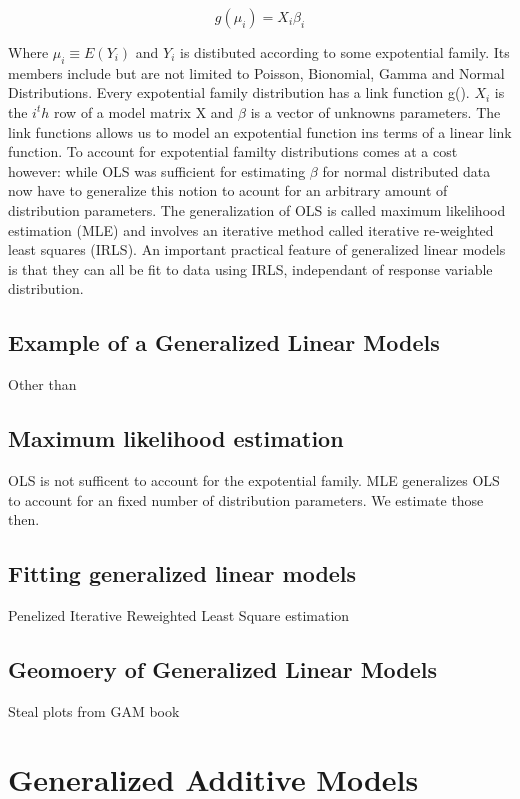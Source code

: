 \documentclass{article}
\begin{document}
        \begin{equation} g(\mu_i) = X_i \beta_i \end{equation}


    Where $\mu_i \equiv E(Y_i)$ and $Y_i$ is distibuted according to some expotential family. Its members include but are not limited to Poisson, Bionomial, Gamma and Normal Distributions. Every expotential family distribution has a link function g(). $X_i$ is the $i^th$ row of a model matrix X and $\beta$ is a vector of unknowns parameters. The link functions allows us to model an expotential function ins terms of a linear link function. To account for expotential familty distributions comes at a cost however: while OLS was sufficient for estimating $\beta$ for normal distributed data now have to generalize this notion to acount for an arbitrary amount of distribution parameters. The generalization of OLS is called maximum likelihood estimation (MLE) and involves an iterative method called iterative re-weighted least squares (IRLS). An important practical feature of generalized linear models is that they can all be fit to data using IRLS, independant of response variable distribution.

    \subsection{Example of a Generalized Linear Models}
    Other than
    \subsection{Maximum likelihood estimation}

    OLS is not sufficent to account for the expotential family. MLE generalizes OLS to account for an fixed number of distribution parameters. We estimate those then.
    \subsection{Fitting generalized linear models}
    Penelized Iterative Reweighted Least Square estimation
    \subsection{Geomoery of Generalized Linear Models}
    Steal plots from GAM book

    \section{Generalized Additive Models}
\end{document}
